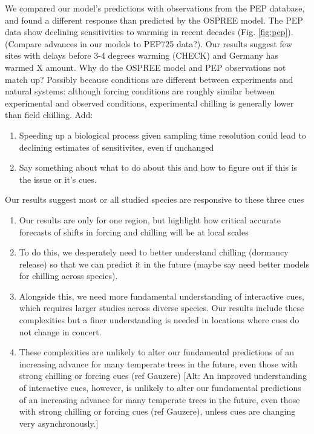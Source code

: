 \documentclass[11pt,letter]{article}
\begin{document}
\par We compared our model's predictions with observations from the PEP database, and found a different response than predicted by the OSPREE model. The PEP data show declining sensitivities to warming in recent decades (Fig. \ref {fig:pep}). (Compare advances in our models to PEP725 data?). Our results suggest few sites with delays before 3-4 degrees warming (CHECK) and Germany has warmed X amount. Why do the OSPREE model and PEP observations not match up? Possibly because conditions are different between experiments and natural systems: although forcing conditions are roughly similar between experimental and observed conditions, experimental chilling is generally lower than field chilling. Add:
\begin{enumerate}
\item Speeding up a biological process given sampling time resolution could lead to declining estimates of sensitivites, even if unchanged
\item Say something about what to do about this and how to figure out if this is the issue or it's cues. 
\end{enumerate}

Our results suggest most or all studied species are responsive to these three cues
\begin{enumerate}
\item Our results are only for one region, but highlight how critical accurate forecasts of shifts in forcing and chilling will be at local scales
\item To do this, we desperately need to better understand chilling (dormancy release) so that we can predict it in the future (maybe say need better models for chilling across species). 
\item Alongside this, we need more fundamental understanding of interactive cues, which requires larger studies across diverse species. Our results include these complexities but a finer understanding is needed in locations where cues do not change in concert.
\item These complexities are unlikely to alter our fundamental predictions of an increasing advance for many temperate trees in the future, even those with strong chilling or forcing cues (ref Gauzere) [Alt: An improved understanding of interactive cues, however, is unlikely to alter our fundamental predictions of an increasing advance for many temperate trees in the future, even those with strong chilling or forcing cues (ref Gauzere), unless cues are changing very asynchronously.]
\end{enumerate}
\end{document}
